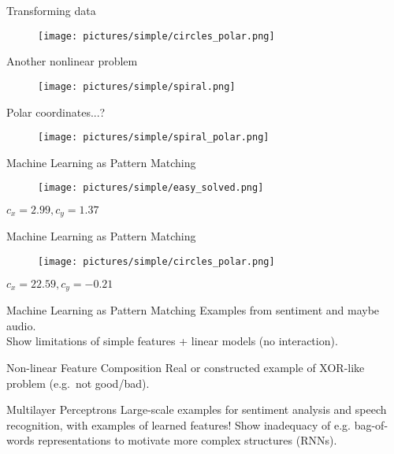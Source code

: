 \documentclass{beamer}
\begin{document}
\begin{frame}{Transforming data}
\begin{figure}
\texttt{[image: pictures/simple/circles\_polar.png]}
\end{figure}
\end{frame}


\begin{frame}{Another nonlinear problem}
\begin{figure}
\texttt{[image: pictures/simple/spiral.png]}
\end{figure}
\end{frame}


\begin{frame}{Polar coordinates...?}
\begin{figure}
\texttt{[image: pictures/simple/spiral\_polar.png]}
\end{figure}
\end{frame}


\begin{frame}{Machine Learning as Pattern Matching}
\begin{figure}
\texttt{[image: pictures/simple/easy\_solved.png]}
\end{figure}
$c_x = 2.99, c_y = 1.37$
\end{frame}


\begin{frame}{Machine Learning as Pattern Matching}
\begin{figure}
\texttt{[image: pictures/simple/circles\_polar.png]}
\end{figure}
$c_x = 22.59, c_y = -0.21$
\end{frame}


\begin{frame}{Machine Learning as Pattern Matching}
Examples from sentiment and maybe audio.\\
Show limitations of simple features + linear models (no interaction).
\end{frame}


\begin{frame}{Non-linear Feature Composition}
Real or constructed example of XOR-like problem (e.g.~not good/bad).
\end{frame}


\begin{frame}{Multilayer Perceptrons}
Large-scale examples for sentiment analysis and speech recognition, with examples of learned features!
Show inadequacy of e.g. bag-of-words representations to motivate more complex structures (RNNs).
\end{frame}
\end{document}
